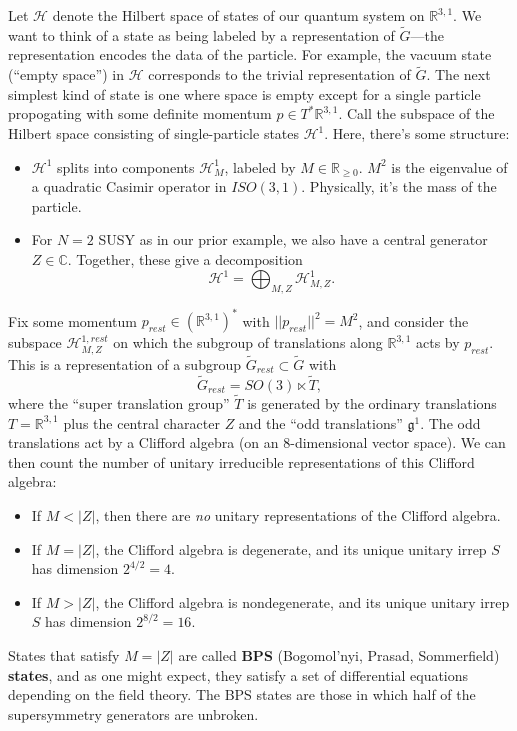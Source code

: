 \documentclass[oneside,english]{amsbook}
\numberwithin{section}{chapter}
\numberwithin{equation}{section}
\numberwithin{figure}{section}
\theoremstyle{plain}
\theoremstyle{definition}
\theoremstyle{remark}
\theoremstyle{definition}
\theoremstyle{definition}
\theoremstyle{plain}
\begin{document}
Let $\mathcal{H}$ denote the Hilbert space of states of our quantum
system on $\mathbb{R}^{3,1}$. We want to think of a state as being
labeled by a representation of $\tilde{G}$---the representation encodes
the data of the particle. For example, the vacuum state (``empty
space'') in $\mathcal{H}$ corresponds to the trivial representation
of $\tilde{G}$. The next simplest kind of state is one where space
is empty except for a single particle propogating with some definite
momentum $p\in T^{*}\mathbb{R}^{3,1}$. Call the subspace of the Hilbert
space consisting of single-particle states $\mathcal{H}^{1}$. Here,
there's some structure:
\begin{itemize}
\item $\mathcal{H}^{1}$ splits into components $\mathcal{H}_{M}^{1}$,
labeled by $M\in\mathbb{R}_{\geq0}$. $M^{2}$ is the eigenvalue of
a quadratic Casimir operator in $ISO(3,1)$. Physically, it's the
mass of the particle. 
\item For $N=2$ SUSY as in our prior example, we also have a central generator
$Z\in\mathbb{C}$. Together, these give a decomposition 
\[
\mathcal{H}^{1}=\bigoplus_{M,Z}\mathcal{H}_{M,Z}^{1}.
\]

\end{itemize}
Fix some momentum $p_{rest}\in\left(\mathbb{R}^{3,1}\right)^{*}$
with $||p_{rest}||^{2}=M^{2}$, and consider the subspace $\mathcal{H}_{M,Z}^{1,rest}$
on which the subgroup of translations along $\mathbb{R}^{3,1}$ acts
by $p_{rest}$. This is a representation of a subgroup $\tilde{G}_{rest}\subset\tilde{G}$
with 
\[
\tilde{G}_{rest}=SO\left(3\right)\ltimes\tilde{T},
\]
where the ``super translation group'' $\tilde{T}$ is generated
by the ordinary translations $T=\mathbb{R}^{3,1}$ plus the central
character $Z$ and the ``odd translations'' $\mathfrak{g}^{1}$.
The odd translations act by a Clifford algebra (on an 8-dimensional
vector space). We can then count the number of unitary irreducible
representations of this Clifford algebra:
\begin{itemize}
\item If $M<\left|Z\right|$, then there are \emph{no} unitary representations
of the Clifford algebra.
\item If $M=\left|Z\right|$, the Clifford algebra is degenerate, and its
unique unitary irrep $S$ has dimension $2^{4/2}=4$. 
\item If $M>\left|Z\right|$, the Clifford algebra is nondegenerate, and
its unique unitary irrep $S$ has dimension $2^{8/2}=16$. 
\end{itemize}
States that satisfy $M=\left|Z\right|$ are called \textbf{BPS} (Bogomol'nyi,
Prasad, Sommerfield) \textbf{states}, and as one might expect, they
satisfy a set of differential equations depending on the field theory.
The BPS states are those in which half of the supersymmetry generators
are unbroken. 
\end{document}

